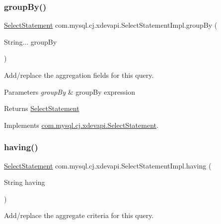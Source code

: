 \subsubsection{\texorpdfstring{group\+By()}{groupBy()}}
{\footnotesize\ttfamily \mbox{\hyperlink{interfacecom_1_1mysql_1_1cj_1_1xdevapi_1_1_select_statement}{Select\+Statement}} com.\+mysql.\+cj.\+xdevapi.\+Select\+Statement\+Impl.\+group\+By (\begin{DoxyParamCaption}\item[{String...}]{group\+By }\end{DoxyParamCaption})}

Add/replace the aggregation fields for this query.


\begin{DoxyParams}{Parameters}
{\em group\+By} & group\+By expression \\
\hline
\end{DoxyParams}
\begin{DoxyReturn}{Returns}
\mbox{\hyperlink{interfacecom_1_1mysql_1_1cj_1_1xdevapi_1_1_select_statement}{Select\+Statement}} 
\end{DoxyReturn}


Implements \mbox{\hyperlink{interfacecom_1_1mysql_1_1cj_1_1xdevapi_1_1_select_statement_aa711a5de1c387d46ff0a940329837ae0}{com.\+mysql.\+cj.\+xdevapi.\+Select\+Statement}}.

\mbox{\label{classcom_1_1mysql_1_1cj_1_1xdevapi_1_1_select_statement_impl_a7c95308255a21648ee6bbe698e934552}} 
\subsubsection{\texorpdfstring{having()}{having()}}
{\footnotesize\ttfamily \mbox{\hyperlink{interfacecom_1_1mysql_1_1cj_1_1xdevapi_1_1_select_statement}{Select\+Statement}} com.\+mysql.\+cj.\+xdevapi.\+Select\+Statement\+Impl.\+having (\begin{DoxyParamCaption}\item[{String}]{having }\end{DoxyParamCaption})}

Add/replace the aggregate criteria for this query.


